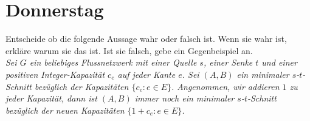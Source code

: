 \documentclass{uebung_cs}
\begin{document}
\section*{Donnerstag}

\begin{aufgabe}
    Entscheide ob die folgende Aussage wahr oder falsch ist. Wenn sie wahr ist, erkläre warum sie das ist. Ist sie falsch, gebe ein Gegenbeispiel an.\\
    \textit{Sei $G$ ein beliebiges Flussnetzwerk mit einer Quelle $s$, einer Senke $t$ und einer positiven Integer-Kapazität $c_e$ auf jeder Kante $e$. Sei $(A,B)$ ein minimaler $s$-$t$-Schnitt bezüglich der Kapazitäten $\{c_e : e \in E\}$. Angenommen, wir addieren $1$ zu jeder Kapazität, dann ist $(A,B)$ immer noch ein minimaler $s$-$t$-Schnitt bezüglich der neuen Kapazitäten $\{1 + c_e : e \in E\}$.}
\end{aufgabe}
\end{document}
